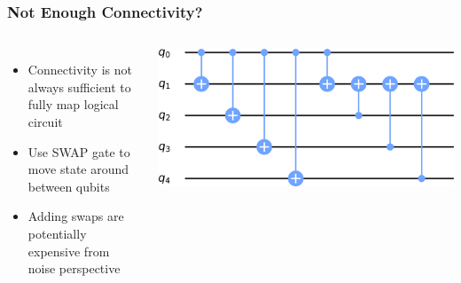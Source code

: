 \documentclass[aspectratio=169,11pt,hyperref={colorlinks=true}]{beamer}
\begin{document}
\begin{frame}
    \frametitle{Not Enough Connectivity?}
    \begin{columns}
            \begin{itemize}
                \item Connectivity is not always sufficient to fully map logical circuit
                \item Use SWAP gate to move state around between qubits
                \item Adding swaps are potentially expensive from noise perspective
            \end{itemize}
            \begin{center}
             {
                \includegraphics[width=\textwidth]{must_swap.png}
            }
            \end{center}
    \end{columns}
\end{frame}
\end{document}
